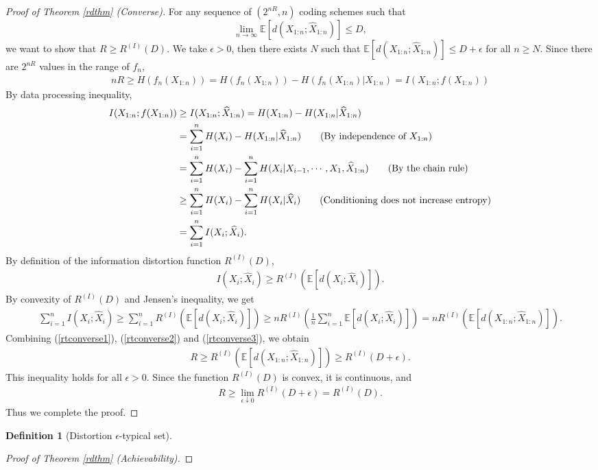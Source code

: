 \documentclass{article}
\numberwithin{equation}{section}
\newcommand{\E}{\mathbb{E}}
\newcommand{\wh}{\widehat}
\theoremstyle{plain}
\theoremstyle{definition}
\newtheorem{definition}[theorem]{Definition}
\begin{document}
\begin{proof}[Proof of Theorem \ref{rdthm} (Converse)]
	For any sequence of $(2^{nR},n)$ coding schemes such that $$\lim_{n\to\infty}\E[d(X_{1:n};\wh{X}_{1:n})]\leq D,$$ we want to show that $R\geq R^{(I)}(D)$. We take $\epsilon>0$, then there exists $N$ such that $\E[d(X_{1:n};\wh{X}_{1:n})]\leq D+\epsilon$ for all $n\geq N$. Since there are $2^{nR}$ values in the range of $f_n$,  
	\begin{align}
		nR\geq H(f_n(X_{1:n}))= H(f_n(X_{1:n}))-H(f_n(X_{1:n})|X_{1:n})=I(X_{1:n};f(X_{1:n}))\label{rtconverse1}
	\end{align}
	By data processing inequality,
	\begin{align}
		I(X_{1:n};f(X_{1:n}))&\geq I(X_{1:n};\wh{X}_{1:n})=H(X_{1:n})-H(X_{1:n}|\wh{X}_{1:n})\notag\\
		&=\sum_{i=1}^n H(X_i)-H(X_{1:n}|\wh{X}_{1:n})\tag{By independence of $X_{1:n}$}\\
		&=\sum_{i=1}^n H(X_i)-\sum_{i=1}^nH(X_i|X_{i-1},\cdots,X_1,\wh{X}_{1:n})\tag{By the chain rule}\\
		&\geq\sum_{i=1}^n H(X_i)-\sum_{i=1}^nH(X_i|\wh{X}_i)\tag{Conditioning does not increase entropy}\\
		&=\sum_{i=1}^n I(X_i;\wh{X}_i).\label{rtconverse2}
	\end{align}
	By definition of the information distortion function $R^{(I)}(D)$, 
	\begin{align*}
		I(X_i;\wh{X}_i)\geq R^{(I)}\left(\E\left[d(X_i;\wh{X}_i)\right]\right).
	\end{align*}
	By convexity of $R^{(I)}(D)$ and Jensen's inequality, we get
	\begin{align}
		\sum_{i=1}^n I(X_i;\wh{X}_i)\geq\sum_{i=1}^n R^{(I)}\left(\E\left[d(X_i;\wh{X}_i)\right]\right)\geq nR^{(I)}\left(\frac{1}{n}\sum_{i=1}^n\E\left[d(X_i;\wh{X}_i)\right]\right)=nR^{(I)}\left(\E\left[d(X_{1:n};\wh{X}_{1:n})\right]\right).\label{rtconverse3}
	\end{align}
	Combining (\ref{rtconverse1}), (\ref{rtconverse2}) and (\ref{rtconverse3}), we obtain
	\begin{align*}
		R\geq R^{(I)}\left(\E\left[d(X_{1:n};\wh{X}_{1:n})\right]\right)\geq R^{(I)}(D+\epsilon).
	\end{align*}
This inequality holds for all $\epsilon>0$. Since the function $R^{(I)}(D)$ is convex, it is continuous, and
\begin{align*}
	R\geq\lim_{\epsilon\downarrow 0}R^{(I)}(D+\epsilon)=R^{(I)}(D).
\end{align*}
Thus we complete the proof.
\end{proof}
\begin{definition}[Distortion $\epsilon$-typical set]

\end{definition}
\begin{proof}[Proof of Theorem \ref{rdthm} (Achievability)]

\end{proof}
\end{document}

